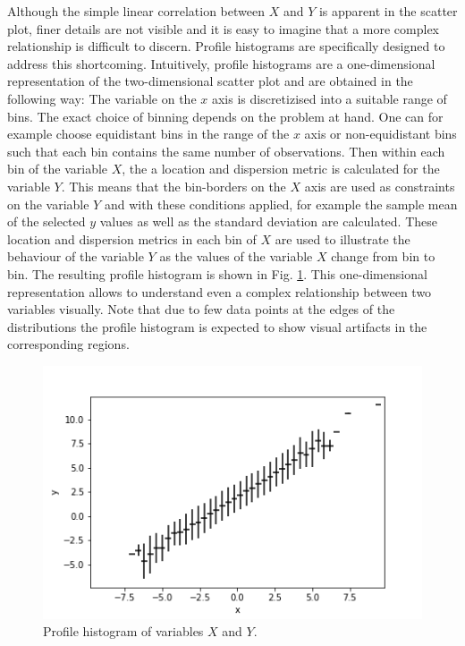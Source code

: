 \documentclass[BCOR=1mm, DIV=calc,10pt,
twoside=true,
twocolumn,
headings=normal]{scrartcl}
\newcommand{\fig}{Fig. }
\begin{document}
Although the simple linear correlation between $X$ and $Y$ is apparent in the scatter plot, finer details are not visible and it is easy to imagine that a more complex relationship is difficult to discern. Profile histograms are specifically designed to address this shortcoming. Intuitively, profile histograms are a one-dimensional representation of the two-dimensional scatter plot and are obtained  in the following way: The variable on the $x$ axis is discretizised into a suitable range of bins. The exact choice of binning depends on the problem at hand. One can for example choose equidistant bins in the range of the $x$ axis or non-equidistant bins such that each bin contains the same number of observations. Then within each bin of the variable $X$, the a location and dispersion metric is calculated for the variable $Y$. This means that the bin-borders on the $X$ axis are used as constraints on the variable $Y$ and with these conditions applied, for example the sample mean of the selected $y$ values as well as the standard deviation are calculated. These location and dispersion metrics in each bin of $X$ are used to illustrate the behaviour of the variable $Y$ as the values of the variable $X$ change from bin to bin. The resulting profile histogram is shown in \fig \ref{fig:profile}. This one-dimensional representation allows to understand even a complex relationship between two variables visually. Note that due to few data points at the edges of the distributions the profile histogram is expected to show visual artifacts in the corresponding regions.

 \begin{figure}
\begin{center}
\includegraphics[scale=0.5]{../figures/profile}
\caption{\label{fig:profile} Profile histogram of variables $X$ and $Y$.}
\end{center}
\end{figure}
\end{document}
